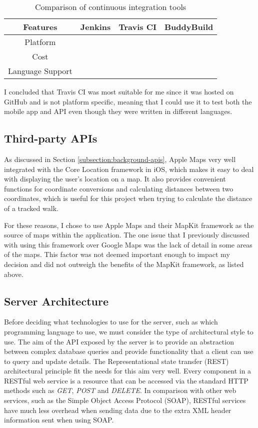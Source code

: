 \begin{table}[hbt]
  \centering
  \begin{tabular}{|c||c|c|c|}
    \hline
    Features & Jenkins & Travis CI & BuddyBuild \\
    \hline
    \hline
    Platform & & & \\
    \hline
    Cost & & & \\
    \hline
    Language Support & & & \\
    \hline
  \end{tabular}
  \caption{Comparison of continuous integration tools}
  \label{table:ci-tools-options}
\end{table}




I concluded that Travis CI was most suitable for me since it was hosted on GitHub and is not platform specific, meaning that I could use it to test both the mobile app and API even though they were written in different languages.

\subsection{Third-party APIs}

As discussed in Section \ref{subsection:background-apis}, Apple Maps very well integrated with the Core Location framework in iOS, which makes it easy to deal with displaying the user's location on a map. It also provides convenient functions for coordinate conversions and calculating distances between two coordinates, which is useful for this project when trying to calculate the distance of a tracked walk.

For these reasons, I chose to use Apple Maps and their MapKit framework as the source of maps within the application. The one issue that I previously discussed with using this framework over Google Maps was the lack of detail in some areas of the maps. This factor was not deemed important enough to impact my decision and did not outweigh the benefits of the MapKit framework, as listed above.


\subsection{Server Architecture}

Before deciding what technologies to use for the server, such as which programming language to use, we must consider the type of architectural style to use. The aim of the API exposed by the server is to provide an abstraction between complex database queries and provide functionality that a client can use to query and update details. The Representational state transfer (REST) architectural principle fit the needs for this aim very well. Every component in a RESTful web service is a resource that can be accessed via the standard HTTP methods such as \textit{GET}, \textit{POST} and \textit{DELETE}. In comparison with other web services, such as the Simple Object Access Protocol (SOAP), RESTful services have much less overhead when sending data due to the extra XML header information sent when using SOAP.

